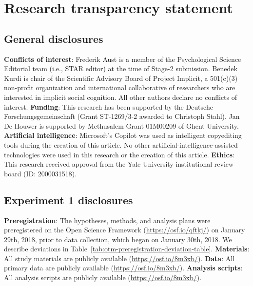\documentclass[
  man,floatsintext]{apa6}
\begin{document}
\hypertarget{research-transparency-statement}{%
\section{Research transparency statement}\label{research-transparency-statement}}

\hypertarget{general-disclosures}{%
\subsection{General disclosures}\label{general-disclosures}}

\textbf{Conflicts of interest}:
Frederik Aust is a member of the Psychological Science Editorial team (i.e., STAR editor) at the time of Stage-2 submission.
Benedek Kurdi is chair of the Scientific Advisory Board of Project Implicit, a 501(c)(3) non-profit organization and international collaborative of researchers who are interested in implicit social cognition.
All other authors declare no conflicts of interest.
\textbf{Funding}:
This research has been supported by the Deutsche Forschungsgemeinschaft (Grant ST-1269/3-2 awarded to Christoph Stahl).
Jan De Houwer is supported by Methusalem Grant 01M00209 of Ghent University.
\textbf{Artificial intelligence}: Microsoft's Copilot was used as intelligent copyediting tools during the creation of this article.
No other artificial-intelligence-assisted technologies were used in this research or the creation of this article.
\textbf{Ethics}: This research received approval from the Yale University institutional review board (ID: 2000031518).

\hypertarget{experiment-1-disclosures}{%
\subsection{Experiment 1 disclosures}\label{experiment-1-disclosures}}

\textbf{Preregistration}: The hypotheses, methods, and analysis plans were preregistered on the Open Science Framework (\url{https://osf.io/qftkj/}) on January 29th, 2018, prior to data collection, which began on January 30th, 2018. We describe deviations in Table~\ref{tab:otm-preregistration-deviation-table}.
\textbf{Materials}: All study materials are publicly available (\url{https://osf.io/8m3xb/}).
\textbf{Data}: All primary data are publicly available (\url{https://osf.io/8m3xb/}).
\textbf{Analysis scripts}: All analysis scripts are publicly available (\url{https://osf.io/8m3xb/}).
\end{document}
